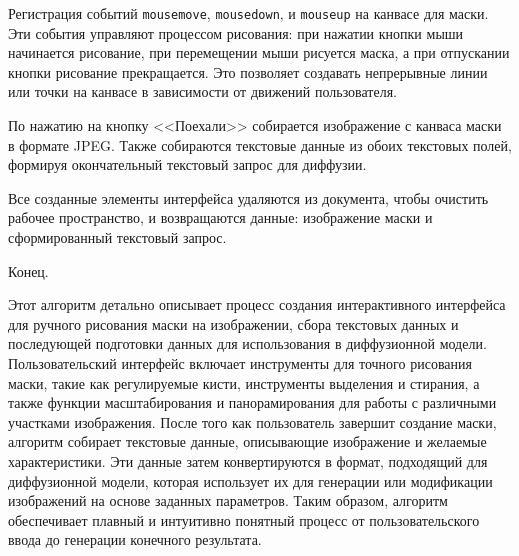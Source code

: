 \begin{enumerate_step}
    \item Регистрация событий \lstinline{mousemove}, \lstinline{mousedown}, и \lstinline{mouseup} на канвасе для маски. Эти события управляют процессом рисования: при нажатии кнопки мыши начинается рисование, при перемещении мыши рисуется маска, а при отпускании кнопки рисование прекращается. Это позволяет создавать непрерывные линии или точки на канвасе в зависимости от движений пользователя.
    \item По нажатию на кнопку <<Поехали>> собирается изображение с канваса маски в формате JPEG. Также собираются текстовые данные из обоих текстовых полей, формируя окончательный текстовый запрос для диффузии.
    \item Все созданные элементы интерфейса удаляются из документа, чтобы очистить рабочее пространство, и возвращаются данные: изображение маски и сформированный текстовый запрос.
    \item Конец.
\end{enumerate_step}

Этот алгоритм детально описывает процесс создания интерактивного интерфейса для ручного рисования маски на изображении, сбора текстовых данных и последующей подготовки данных для использования в диффузионной модели. Пользовательский интерфейс включает инструменты для точного рисования маски, такие как регулируемые кисти, инструменты выделения и стирания, а также функции масштабирования и панорамирования для работы с различными участками изображения. После того как пользователь завершит создание маски, алгоритм собирает текстовые данные, описывающие изображение и желаемые характеристики. Эти данные затем конвертируются в формат, подходящий для диффузионной модели, которая использует их для генерации или модификации изображений на основе заданных параметров. Таким образом, алгоритм обеспечивает плавный и интуитивно понятный процесс от пользовательского ввода до генерации конечного результата.
